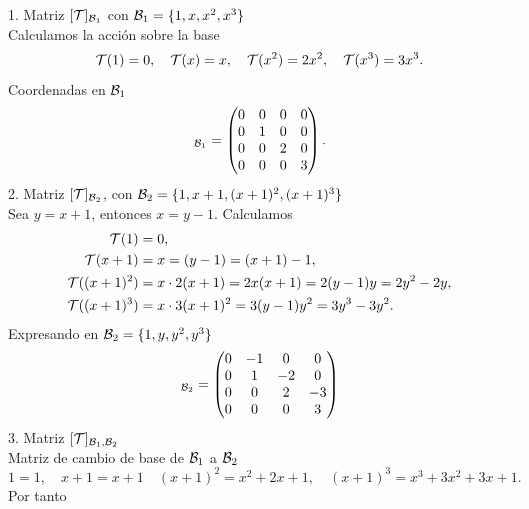 \documentclass[12pt,a4paper]{article}
\begin{document}
    \begin{solucion}
        1. Matriz $[\mathcal{T}]_{\mathcal{B}_{1}}$ con $\mathcal{B}_{1}=\{1,x,x^{2},x^{3}\}$\\
        Calculamos la acción sobre la base
        \begin{equation*}
            \mathcal{T}(1)=0,\quad\mathcal{T}(x)=x,\quad\mathcal{T}(x^{2})=2x^{2},\quad\mathcal{T}(x^{3})=3x^{3}.
        \end{equation*}
        Coordenadas en $\mathcal{B}_{1}$
        \begin{equation*}
            [\TT]_{\BB_{1}}=
            \begin{pmatrix}
                0 & 0 & 0 & 0\\
                0 & 1 & 0 & 0\\
                0 & 0 & 2 & 0\\
                0 & 0 & 0 & 3
            \end{pmatrix}.
        \end{equation*}
        2. Matriz $[\mathcal{T}]_{\mathcal{B}_{2}}$, con $\mathcal{B}_{2}=\{1,x+1,(x+1)^{2},(x+1)^{3}\}$\\
        Sea $y=x+1$, entonces $x=y-1$. Calculamos
        \begin{align*}
            \mathcal{T}(1)&=0,\\
            \mathcal{T}(x+1)&=x=(y-1)=(x+1)-1,\\
            \mathcal{T}((x+1)^{2})&=x\cdot2(x+1)=2x(x+1)=2(y-1)y=2y^{2}-2y,\\
            \mathcal{T}((x+1)^{3})&=x\cdot3(x+1)^{2}=3(y-1)y^{2}=3y^{3}-3y^{2}.
        \end{align*}
        Expresando en $\mathcal{B}_{2}=\{1,y,y^{2},y^{3}\}$
        \begin{equation*}
            [\TT]_{\BB_{2}}=
            \begin{pmatrix}
                0 & -1 & 0 & 0\\
                0 & 1 & -2 & 0\\
                0 & 0 & 2 & -3\\
                0 & 0 & 0 & 3
            \end{pmatrix}
        \end{equation*}
        3. Matriz $[\mathcal{T}]_{\mathcal{B}_{1},\mathcal{B}_{2}}$\\
        Matriz de cambio de base de $\mathcal{B}_{1}$ a $\mathcal{B}_{2}$
        \begin{equation*}
            1=1,\quad x+1=x+1\quad (x+1)^{2}=x^{2}+2x+1,\quad (x+1)^{3}=x^{3}+3x^{2}+3x+1.
        \end{equation*}
        Por tanto

\end{solucion}
\end{document}
